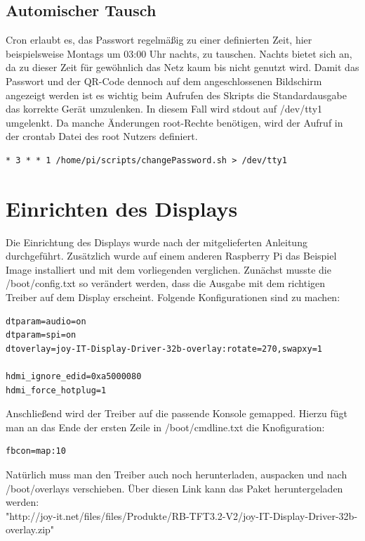 \documentclass[a4paper,11pt,singlespacing]{article}
\begin{document}
    		\subsection{Automischer Tausch}
    			Cron erlaubt es, das Passwort regelmäßig zu einer definierten Zeit, hier beispielsweise Montags um 03:00 Uhr nachts, zu tauschen. Nachts bietet sich an, da zu dieser Zeit für gewöhnlich das Netz kaum bis nicht genutzt wird. Damit das Passwort und der QR-Code dennoch auf dem angeschlossenen Bildschirm angezeigt werden ist es wichtig beim Aufrufen des Skripts die Standardausgabe das korrekte Gerät umzulenken. In diesem Fall wird stdout auf /dev/tty1 umgelenkt. Da manche Änderungen root-Rechte benötigen, wird der Aufruf in der crontab Datei des root Nutzers definiert.
    			\begin{lstlisting}
* 3 * * 1 /home/pi/scripts/changePassword.sh > /dev/tty1
    			\end{lstlisting}
    		
    	\section{Einrichten des Displays}
    		Die Einrichtung des Displays wurde nach der mitgelieferten Anleitung durchgeführt. \cite{Quote_display_manual} Zusätzlich wurde auf einem anderen Raspberry Pi das Beispiel Image installiert und mit dem vorliegenden verglichen. Zunächst musste die /boot/config.txt so verändert werden, dass die Ausgabe mit dem richtigen Treiber auf dem Display erscheint. Folgende Konfigurationen sind zu machen:
    		\begin{lstlisting}
dtparam=audio=on
dtparam=spi=on
dtoverlay=joy-IT-Display-Driver-32b-overlay:rotate=270,swapxy=1

hdmi_ignore_edid=0xa5000080
hdmi_force_hotplug=1
    		\end{lstlisting}
    		
    		Anschließend wird der Treiber auf die passende Konsole gemapped. Hierzu fügt man an das Ende der ersten Zeile in /boot/cmdline.txt die Knofiguration:
    		\begin{lstlisting}
fbcon=map:10
    		\end{lstlisting}

			Natürlich muss man den Treiber auch noch herunterladen, auspacken und nach /boot/overlays verschieben. Über diesen Link kann das Paket heruntergeladen werden:\\
			
			"http://joy-it.net/files/files/Produkte/RB-TFT3.2-V2/joy-IT-Display-Driver-32b-overlay.zip" \\
\end{document}

